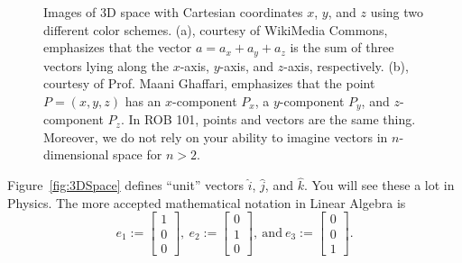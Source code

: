 \begin{figure}[htb]%
\centering
{}%
\hspace{100pt}%
%
\caption[]{Images of 3D space with Cartesian coordinates $x$, $y$, and $z$ using two different color schemes. (a), courtesy of WikiMedia Commons, emphasizes that the vector $a = a_x + a_y+a_z$ is the sum of three vectors lying along the $x$-axis, $y$-axis, and $z$-axis, respectively. (b), courtesy of Prof. Maani Ghaffari, emphasizes that the point $P=(x,y,z)$ has an $x$-component $P_x$, a $y$-component $P_y$, and $z$-component $P_z$. In ROB 101, points and vectors are the same thing. Moreover, we do not rely on your ability to imagine vectors in $n$-dimensional space for $n >2$.}
    \label{fig:3Dvectors}
\end{figure}

\vspace*{0.5cm}

\begin{tcolorbox}[title=\textbf{3 Special Vectors in $\real^3$}]
Figure~\ref{fig:3DSpace} defines ``unit'' vectors $\widehat{i}$, $\widehat{j}$, and $\widehat{k}$. You will see these a lot in Physics.
The more accepted mathematical notation in Linear Algebra is
$$e_1 := \begin{bmatrix} 1  \\ 0\\ 0\end{bmatrix},~e_2 := \begin{bmatrix} 0 \\ 1 \\ 0 \end{bmatrix}, ~\text{and}~ e_3 := \begin{bmatrix}0 \\ 0\\ 1 \end{bmatrix}.$$
\end{tcolorbox}


